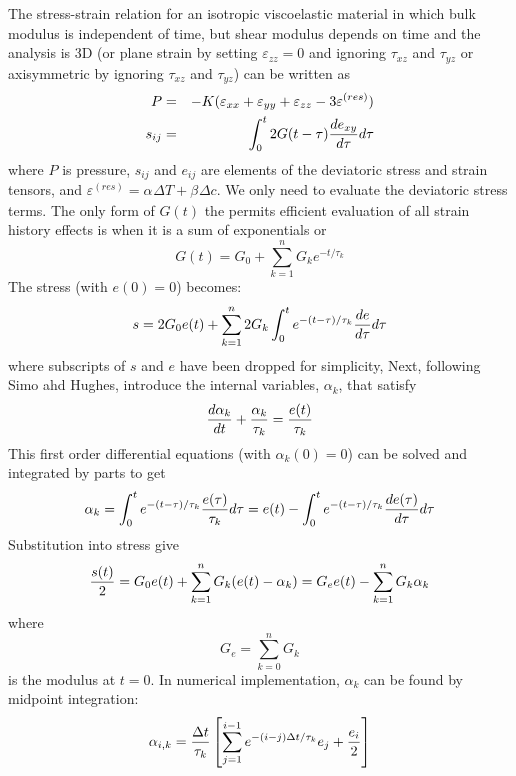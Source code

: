 \documentclass[11pt]{article}
\def\a#1{\alpha_{#1}}
\def\b#1{\beta_{#1}}
\def\DT{\Delta T}
\def\e#1{\varepsilon_{#1}}
\def\er#1{\varepsilon_{#1}^{(res)}}
\def\t#1{\tau_{#1}}
\begin{document}
The stress-strain relation for an isotropic viscoelastic material in which bulk modulus is independent of time, but shear modulus depends on time and the analysis is 3D (or plane strain by setting $\e{zz}=0$ and ignoring $\t{xz}$ and $\t{yz}$ or axisymmetric by ignoring $\t{xz}$ and $\t{yz}$) can be written as
\begin{eqnarray}
      P & = & -K(\e{xx} + \e{yy} + \e{zz} - 3\er{})  \\
      s_{ij} & = & \int_0^t 2G(t-\tau) {de_{xy}\over d\tau} d\tau
\end{eqnarray}
where $P$ is pressure, $s_{ij}$ and $e_{ij}$ are elements of the deviatoric stress and strain tensors, and $\er{} = \a{}\DT + \b{}\Delta c$.
We only need to evaluate the deviatoric stress terms. The only form of $G(t)$ the permits efficient evaluation of all strain history effects is when it is a sum of exponentials or
\begin{equation}
        G(t) = G_0 + \sum_{k=1}^n G_k e^{-t/\tau_k}
\end{equation}
The stress (with $e(0)=0$) becomes:
\begin{equation}
     s = 2G_0 e(t) + \sum_{k=1}^n 2 G_k \int_0^t e^{-(t-\tau)/\tau_k} {de\over d\tau} d\tau
\end{equation}
where subscripts of $s$ and $e$ have been dropped for simplicity,
Next, following Simo ahd Hughes, introduce the internal variables, $\alpha_k$, that satisfy
\begin{equation}
       {d\alpha_k\over dt} + {\alpha_k\over \tau_k} = {e(t)\over \tau_k}
\end{equation}
This first order differential equations (with $\alpha_k(0)=0$) can be solved and integrated by parts to get
\begin{equation}
      \alpha_k = \int_0^t e^{-(t-\tau)/\tau_k} {e(\tau)\over \tau_k}d\tau = e(t) - \int_0^t e^{-(t-\tau)/\tau_k} {de(\tau)\over d\tau}d\tau
\end{equation}
Substitution into stress give
\begin{equation}
     {s(t)\over2} = G_0 e(t) + \sum_{k=1}^n G_k (e(t) - \alpha_k )= G_e e(t) -  \sum_{k=1}^n G_k \alpha_k
\end{equation}
where
\begin{equation}
     G_e = \sum_{k=0}^n G_k
\end{equation}
is the modulus at $t=0$. In numerical implementation, $\alpha_k$ can be found by midpoint integration:
\begin{equation}
     \alpha_{i,k} = {\Delta t\over \tau_k}\left[ \sum_{j=1}^{i-1} e^{-(i-j)\Delta t/\tau_k} e_j  + {e_i\over 2}\right]
\end{equation}
\end{document}
